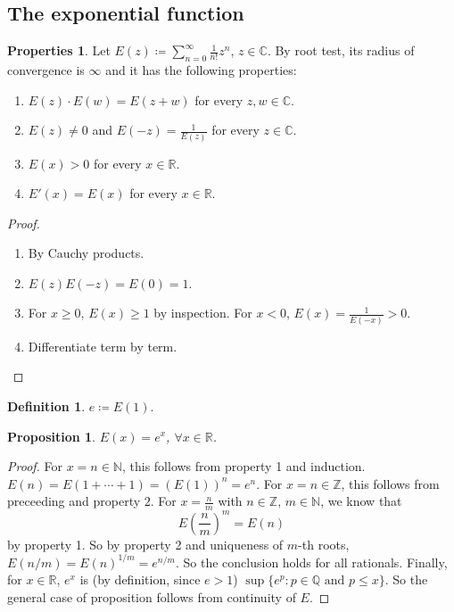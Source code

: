 \documentclass[12pt]{article}
\theoremstyle{plain}
\newtheorem*{prop}{Proposition}
\theoremstyle{definition}
\newtheorem*{defn}{Definition}
\newtheorem*{property}{Properties}
\begin{document}
\subsection*{The exponential function}
\begin{property}
    Let
    $E(z)\coloneqq \sum_{n=0}^\infty \frac{1}{n!} z^n$, $z\in \mathbb{C}$.
    By root test, its radius of convergence is $\infty$ and it has the following properties:
    \begin{enumerate}
        \item $E(z)\cdot E(w) = E(z+w)$ for every $z,w\in\mathbb{C}$.
        \item $E(z)\neq0$ and $E(-z) = \frac{1}{E(z)}$ for every $z\in\mathbb{C}$.
        \item $E(x)>0$ for every $x\in \mathbb{R}$.
        \item $E'(x) = E(x)$ for every $x\in \mathbb{R}$.
    \end{enumerate}
\end{property}
\begin{proof}
    \begin{enumerate}
        \item By Cauchy products.
        \item $E(z)E(-z) = E(0) = 1$.
        \item For $x\geq 0$, $E(x)\geq 1$ by inspection.
            For $x< 0$, $E(x) = \frac{1}{E(-x)} > 0$.
        \item Differentiate term by term.
    \end{enumerate}
\end{proof}

\begin{defn}
    $e\coloneqq E(1)$.
\end{defn}

\begin{prop}
    $E(x) = e^x$, $\forall x\in\mathbb{R}$.
\end{prop}
\begin{proof}
    For $x=n\in\mathbb{N}$, this follows from property 1 and induction.
    $E(n) = E(1+\cdots + 1) = (E(1))^n = e^n$.
    For $x = n\in \mathbb{Z}$, this follows from preceeding and property $2$.
    For $x=\frac{n}{m}$ with $n\in\mathbb{Z}$, $m\in\mathbb{N}$, we know that
    \[ E\left(\frac{n}{m}\right)^m = E(n)\]
    by property 1.
    So by property 2 and uniqueness of $m$-th roots,
    $E(n/m) = E(n)^{1/m} = e^{n/m}$.
    So the conclusion holds for all rationals.
    Finally, for $x\in\mathbb{R}$, $e^x$ is (by definition, since $e>1$) $\sup\{e^p:p\in\mathbb{Q}\text{ and }p\leq x\}$.
    So the general case of proposition follows from continuity of $E$.
\end{proof}
\end{document}
